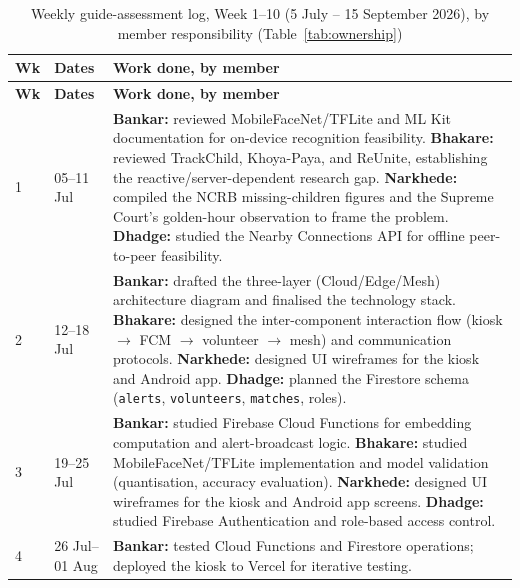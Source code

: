 \documentclass[12pt,a4paper,oneside]{report}
\newcommand{\code}[1]{\texttt{#1}}
\begin{document}
\small
\begin{longtable}{|p{0.9cm}|p{2.1cm}|p{10.7cm}|}
\caption{Weekly guide-assessment log, Week 1--10 (5 July -- 15 September 2026), by member responsibility (Table~\ref{tab:ownership})}
\label{tab:weeklylog}\\
\hline
\textbf{Wk} & \textbf{Dates} & \textbf{Work done, by member} \\
\hline
\endfirsthead
\hline
\textbf{Wk} & \textbf{Dates} & \textbf{Work done, by member} \\
\hline
\endhead
1 & 05--11 Jul &
\textbf{Bankar:} reviewed MobileFaceNet/TFLite and ML Kit documentation for on-device recognition feasibility.\newline
\textbf{Bhakare:} reviewed TrackChild, Khoya-Paya, and ReUnite, establishing the reactive/server-dependent research gap.\newline
\textbf{Narkhede:} compiled the NCRB missing-children figures and the Supreme Court's golden-hour observation to frame the problem.\newline
\textbf{Dhadge:} studied the Nearby Connections API for offline peer-to-peer feasibility. \\ \hline
2 & 12--18 Jul &
\textbf{Bankar:} drafted the three-layer (Cloud/Edge/Mesh) architecture diagram and finalised the technology stack.\newline
\textbf{Bhakare:} designed the inter-component interaction flow (kiosk $\to$ FCM $\to$ volunteer $\to$ mesh) and communication protocols.\newline
\textbf{Narkhede:} designed UI wireframes for the kiosk and Android app.\newline
\textbf{Dhadge:} planned the Firestore schema (\code{alerts}, \code{volunteers}, \code{matches}, roles). \\ \hline
3 & 19--25 Jul &
\textbf{Bankar:} studied Firebase Cloud Functions for embedding computation and alert-broadcast logic.\newline
\textbf{Bhakare:} studied MobileFaceNet/TFLite implementation and model validation (quantisation, accuracy evaluation).\newline
\textbf{Narkhede:} designed UI wireframes for the kiosk and Android app screens.\newline
\textbf{Dhadge:} studied Firebase Authentication and role-based access control. \\ \hline
4 & 26 Jul--01 Aug &
\textbf{Bankar:} tested Cloud Functions and Firestore operations; deployed the kiosk to Vercel for iterative testing.\newline

\end{longtable}
\end{document}
